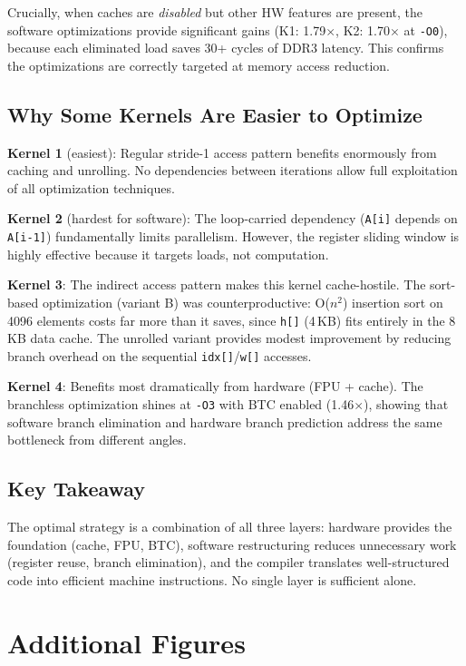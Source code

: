 \documentclass[11pt,a4paper]{article}
\begin{document}
Crucially, when caches are \emph{disabled} but other HW features are present, the software optimizations provide significant gains (K1: 1.79$\times$, K2: 1.70$\times$ at \texttt{-O0}), because each eliminated load saves 30+ cycles of DDR3 latency. This confirms the optimizations are correctly targeted at memory access reduction.

\subsection{Why Some Kernels Are Easier to Optimize}

\noindent\textbf{Kernel 1} (easiest): Regular stride-1 access pattern benefits enormously from caching and unrolling. No dependencies between iterations allow full exploitation of all optimization techniques.

\noindent\textbf{Kernel 2} (hardest for software): The loop-carried dependency (\texttt{A[i]} depends on \texttt{A[i-1]}) fundamentally limits parallelism. However, the register sliding window is highly effective because it targets loads, not computation.

\noindent\textbf{Kernel 3}: The indirect access pattern makes this kernel cache-hostile. The sort-based optimization (variant B) was counterproductive: O($n^2$) insertion sort on 4096 elements costs far more than it saves, since \texttt{h[]} (4\,KB) fits entirely in the 8\,KB data cache. The unrolled variant provides modest improvement by reducing branch overhead on the sequential \texttt{idx[]}/\texttt{w[]} accesses.

\noindent\textbf{Kernel 4}: Benefits most dramatically from hardware (FPU + cache). The branchless optimization shines at \texttt{-O3} with BTC enabled (1.46$\times$), showing that software branch elimination and hardware branch prediction address the same bottleneck from different angles.

\subsection{Key Takeaway}

The optimal strategy is a combination of all three layers: hardware provides the foundation (cache, FPU, BTC), software restructuring reduces unnecessary work (register reuse, branch elimination), and the compiler translates well-structured code into efficient machine instructions. No single layer is sufficient alone.

\newpage
\appendix
\section{Additional Figures}
\end{document}
